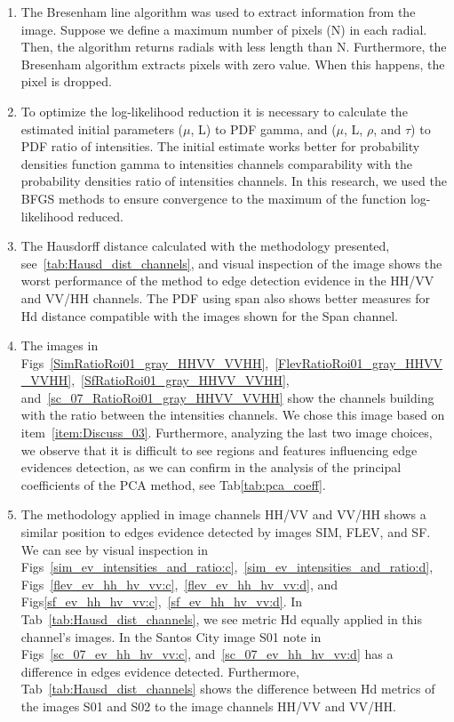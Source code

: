 \documentclass[remotesensing,article,submit,pdftex,moreauthors]{Definitions/mdpi}
\begin{document}
\begin{enumerate}[label=(\roman*)]
%
\item The Bresenham line algorithm was used to extract information from the image. Suppose we define a maximum number of pixels (N) in each radial. Then, the algorithm returns radials with less length than N. Furthermore, the Bresenham algorithm extracts pixels with zero value. When this happens, the pixel is dropped.\label{item:Discuss_01}
%
\item To optimize the log-likelihood reduction it is necessary to calculate the estimated initial parameters ($\mu$, L) to PDF gamma, and  ($\mu$, L, $\rho$, and $\tau$) to PDF ratio of intensities. The initial estimate works better for probability densities function gamma to intensities channels comparability with the probability densities ratio of intensities channels. In this research, we used the BFGS methods to ensure convergence to the maximum of the function log-likelihood reduced.\label{item:Discuss_02}
\item The Hausdorff distance calculated with the methodology presented, see~\eqref{tab:Hausd_dist_channels},  and visual inspection of the image shows the worst performance of the method to edge detection evidence in the HH/VV and VV/HH channels. The PDF using span also shows better measures for Hd distance compatible with the images shown for the Span channel.\label{item:Discuss_03}
%
\item The images in Figs~\eqref{SimRatioRoi01_gray_HHVV_VVHH},~\eqref{FlevRatioRoi01_gray_HHVV_VVHH},~\eqref{SfRatioRoi01_gray_HHVV_VVHH}, and~\eqref{sc_07_RatioRoi01_gray_HHVV_VVHH} show the channels building with the ratio between the intensities channels. We chose this image based on item~\ref{item:Discuss_03}. Furthermore, analyzing the last two image choices, we observe that it is difficult to see regions and features influencing edge evidences detection, as we can confirm in the analysis of the principal coefficients of the PCA method, see Tab\eqref{tab:pca_coeff}.\label{item:Discuss_04}
%
\item The methodology applied in image channels HH/VV and VV/HH shows a similar position to edges evidence detected by images SIM, FLEV, and SF. We can see by visual inspection in Figs~\eqref{sim_ev_intensities_and_ratio:c},~\eqref{sim_ev_intensities_and_ratio:d}, Figs~\eqref{flev_ev_hh_hv_vv:c},~\eqref{flev_ev_hh_hv_vv:d}, and Figs\eqref{sf_ev_hh_hv_vv:c},~\eqref{sf_ev_hh_hv_vv:d}. In Tab~\eqref{tab:Hausd_dist_channels}, we see metric Hd equally applied in this channel's images. In the Santos City image S01 note in Figs~\eqref{sc_07_ev_hh_hv_vv:c}, and~\eqref{sc_07_ev_hh_hv_vv:d} has a difference in edges evidence detected. Furthermore, Tab~\eqref{tab:Hausd_dist_channels} shows the difference between Hd metrics of the images S01 and S02 to the image channels HH/VV and VV/HH. \label{item:Discuss_05}

\end{enumerate}
\end{document}
